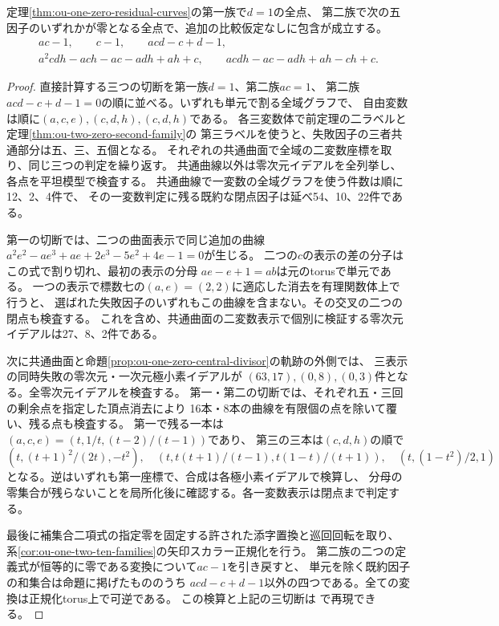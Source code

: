 \begin{proposition}[一零二族の六つの因子での全特殊化]
\label{prop:ou-one-zero-closed-divisors}
定理\ref{thm:ou-one-zero-residual-curves}の第一族で$d=1$の全点、
第二族で次の五因子のいずれかが零となる全点で、追加の比較仮定なしに包含が成立する。
\[
 \begin{gathered}
 ac-1,\qquad c-1,\qquad acd-c+d-1,\\
 a^2cdh-ach-ac-adh+ah+c,\qquad acdh-ac-adh+ah-ch+c .
 \end{gathered}
\]
\end{proposition}
\begin{proof}
直接計算する三つの切断を第一族$d=1$、第二族$ac=1$、
第二族$acd-c+d-1=0$の順に並べる。いずれも単元で割る全域グラフで、
自由変数は順に$(a,c,e),(c,d,h),(c,d,h)$である。
各三変数体で前定理の二ラベルと定理\ref{thm:ou-two-zero-second-family}の
第三ラベルを使うと、失敗因子の三者共通部分は五、三、五個となる。
それぞれの共通曲面で全域の二変数座標を取り、同じ三つの判定を繰り返す。
共通曲線以外は零次元イデアルを全列挙し、各点を平坦模型で検査する。
共通曲線で一変数の全域グラフを使う件数は順に12、2、4件で、
その一変数判定に残る既約な閉点因子は延べ54、10、22件である。

第一の切断では、二つの曲面表示で同じ追加の曲線
$a^2e^2-ae^3+ae+2e^3-5e^2+4e-1=0$が生じる。
二つの$c$の表示の差の分子はこの式で割り切れ、最初の表示の分母
$ae-e+1=ab$は元のtorusで単元である。
一つの表示で標数七の$(a,e)=(2,2)$に適応した消去を有理関数体上で行うと、
選ばれた失敗因子のいずれもこの曲線を含まない。その交叉の二つの閉点も検査する。
これを含め、共通曲面の二変数表示で個別に検証する零次元イデアルは27、8、2件である。

次に共通曲面と命題\ref{prop:ou-one-zero-central-divisor}の軌跡の外側では、
三表示の同時失敗の零次元・一次元極小素イデアルが
$(63,17),(0,8),(0,3)$件となる。全零次元イデアルを検査する。
第一・第二の切断では、それぞれ五・三回の剰余点を指定した頂点消去により
16本・8本の曲線を有限個の点を除いて覆い、残る点も検査する。
第一で残る一本は$(a,c,e)=(t,1/t,(t-2)/(t-1))$であり、
第三の三本は$(c,d,h)$の順で
\[
 (t,(t+1)^2/(2t),-t^2),\quad
 (t,t(t+1)/(t-1),t(1-t)/(t+1)),\quad(t,(1-t^2)/2,1)
\]
となる。逆はいずれも第一座標で、合成は各極小素イデアルで検算し、
分母の零集合が残らないことを局所化後に確認する。各一変数表示は閉点まで判定する。

最後に補集合二項式の指定零を固定する許された添字置換と巡回回転を取り、
系\ref{cor:ou-one-two-ten-families}の矢印スカラー正規化を行う。
第二族の二つの定義式が恒等的に零である変換について$ac-1$を引き戻すと、
単元を除く既約因子の和集合は命題に掲げたもののうち
$acd-c+d-1$以外の四つである。全ての変換は正規化torus上で可逆である。
この検算と上記の三切断は
で再現できる。
\end{proof}

